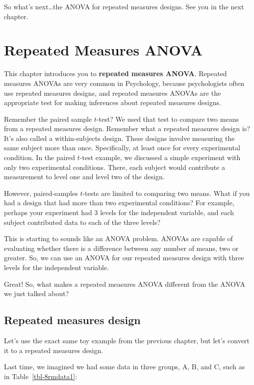 \documentclass[
  letterpaper,
  DIV=11,
  numbers=noendperiod]{scrreprt}
\begin{document}
So what's next\ldots the ANOVA for repeated measures designs. See you in
the next chapter.


\chapter{Repeated Measures ANOVA}\label{repeated-measures-anova}

This chapter introduces you to \textbf{repeated measures ANOVA}.
Repeated measures ANOVAs are very common in Psychology, because
psychologists often use repeated measures designs, and repeated measures
ANOVAs are the appropriate test for making inferences about repeated
measures designs.

Remember the paired sample \(t\)-test? We used that test to compare two
means from a repeated measures design. Remember what a repeated measures
design is? It's also called a within-subjects design. These designs
involve measuring the same subject more than once. Specifically, at
least once for every experimental condition. In the paired \(t\)-test
example, we discussed a simple experiment with only two experimental
conditions. There, each subject would contribute a measurement to level
one and level two of the design.

However, paired-samples \(t\)-tests are limited to comparing two means.
What if you had a design that had more than two experimental conditions?
For example, perhaps your experiment had 3 levels for the independent
variable, and each subject contributed data to each of the three levels?

This is starting to sounds like an ANOVA problem. ANOVAs are capable of
evaluating whether there is a difference between any number of means,
two or greater. So, we can use an ANOVA for our repeated measures design
with three levels for the independent variable.

Great! So, what makes a repeated measures ANOVA different from the ANOVA
we just talked about?

\section{Repeated measures design}\label{repeated-measures-design}

Let's use the exact same toy example from the previous chapter, but
let's convert it to a repeated measures design.

Last time, we imagined we had some data in three groups, A, B, and C,
such as in Table~\ref{tbl-8rmdata1}:
\end{document}
